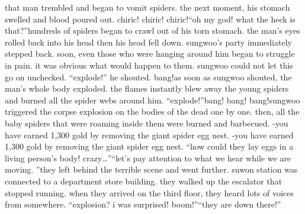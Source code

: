 that man trembled and began to vomit spiders.
 the next moment, his stomach swelled and blood poured out.
chiric! chiric! chiric!“oh my god! what the heck is that?”hundreds of spiders began to crawl out of his torn stomach.
 the man’s eyes rolled back into his head then his head fell down.
sungwoo’s party immediately stepped back.
 soon, even those who were hanging around him began to struggle in pain.
 it was obvious what would happen to them.
 sungwoo could not let this go on unchecked.
“explode!” he shouted.
bang!as soon as sungwoo shouted, the man’s whole body exploded.
 the flames instantly blew away the young spiders and burned all the spider webs around him.
“explode!”bang! bang! bang!sungwoo triggered the corpse explosion on the bodies of the dead one by one.
then, all the baby spiders that were roaming inside them were burned and barbecued.
-you have earned 1,300 gold by removing the giant spider egg nest.
-you have earned 1,300 gold by removing the giant spider egg nest.
“how could they lay eggs in a living person’s body! crazy…”“let’s pay attention to what we hear while we are moving.
”they left behind the terrible scene and went further.
suwon station was connected to a department store building.
 they walked up the escalator that stopped running.
when they arrived on the third floor, they heard lots of voices from somewhere.
“explosion? i was surprised! boom!”“they are down there!”

 